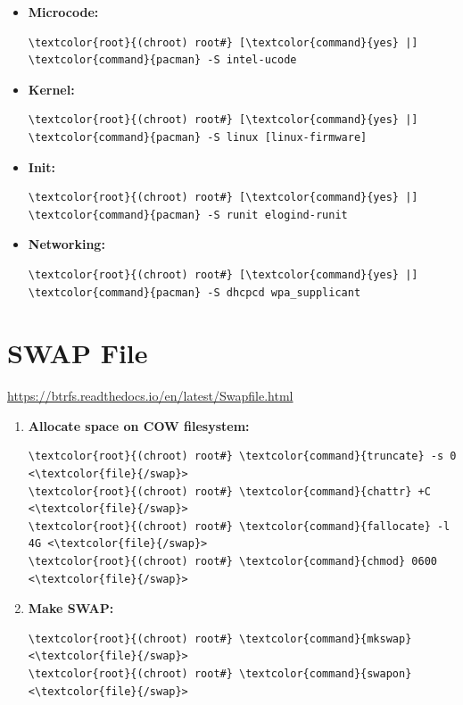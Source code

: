 \documentclass[10pt, a4paper, onecolumn, oneside, titlepage, openany]{book}
\begin{document}
\begin{itemize}
    \item \textbf{Microcode:}
\begin{Verbatim}[commandchars=\\\{\}]
\textcolor{root}{(chroot) root#} [\textcolor{command}{yes} |] \textcolor{command}{pacman} -S intel-ucode
\end{Verbatim}
    \item \textbf{Kernel:}
\begin{Verbatim}[commandchars=\\\{\}]
\textcolor{root}{(chroot) root#} [\textcolor{command}{yes} |] \textcolor{command}{pacman} -S linux [linux-firmware]
\end{Verbatim}
    \item \textbf{Init:}
\begin{Verbatim}[commandchars=\\\{\}]
\textcolor{root}{(chroot) root#} [\textcolor{command}{yes} |] \textcolor{command}{pacman} -S runit elogind-runit
\end{Verbatim}
    \item \textbf{Networking:}
\begin{Verbatim}[commandchars=\\\{\}]
\textcolor{root}{(chroot) root#} [\textcolor{command}{yes} |] \textcolor{command}{pacman} -S dhcpcd wpa_supplicant
\end{Verbatim}
\end{itemize}

\section{SWAP File}
\url{https://btrfs.readthedocs.io/en/latest/Swapfile.html}
\begin{enumerate}
    \item \textbf{Allocate space on COW filesystem:}
\begin{Verbatim}[commandchars=\\\{\}]
\textcolor{root}{(chroot) root#} \textcolor{command}{truncate} -s 0 <\textcolor{file}{/swap}>
\textcolor{root}{(chroot) root#} \textcolor{command}{chattr} +C <\textcolor{file}{/swap}>
\textcolor{root}{(chroot) root#} \textcolor{command}{fallocate} -l 4G <\textcolor{file}{/swap}>
\textcolor{root}{(chroot) root#} \textcolor{command}{chmod} 0600 <\textcolor{file}{/swap}>
\end{Verbatim}
    \item \textbf{Make SWAP:}
\begin{Verbatim}[commandchars=\\\{\}]
\textcolor{root}{(chroot) root#} \textcolor{command}{mkswap} <\textcolor{file}{/swap}>
\textcolor{root}{(chroot) root#} \textcolor{command}{swapon} <\textcolor{file}{/swap}>
\end{Verbatim}
\end{enumerate}
\end{document}
